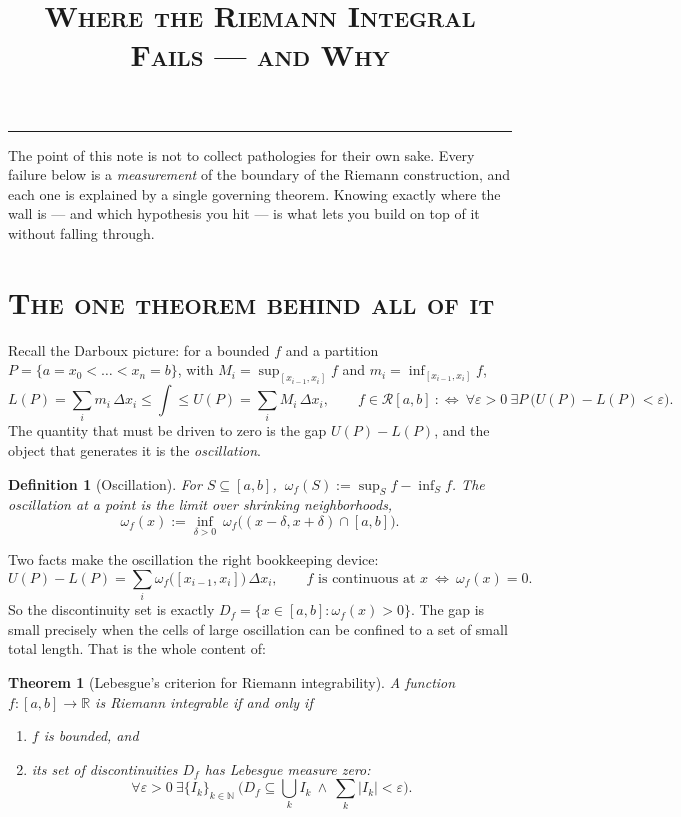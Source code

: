 \documentclass[11pt]{article}
\title{\scshape\color{atlasink} Where the Riemann Integral Fails --- and Why}
\author{}\date{}
\theoremstyle{atlas}
\newtheorem{theorem}{Theorem}
\newtheorem{definition}{Definition}
\newcommand{\R}{\mathbb{R}}
\newcommand{\N}{\mathbb{N}}
\newcommand{\Rint}{\mathcal{R}}
\newcommand{\osc}{\omega_f}
\begin{document}
\maketitle
\vspace{-3.2em}
{\color{atlasink}\rule{\linewidth}{0.8pt}}
\vspace{1em}

The point of this note is not to collect pathologies for their own sake. Every
failure below is a \emph{measurement} of the boundary of the Riemann construction,
and each one is explained by a single governing theorem. Knowing exactly where the
wall is --- and which hypothesis you hit --- is what lets you build on top of it
without falling through.

\section*{\scshape The one theorem behind all of it}

Recall the Darboux picture: for a bounded $f$ and a partition
$P=\{a=x_0<\dots<x_n=b\}$, with $M_i=\sup_{[x_{i-1},x_i]}f$ and
$m_i=\inf_{[x_{i-1},x_i]}f$,
\[
  L(P)=\sum_{i} m_i\,\Delta x_i \le \int \le U(P)=\sum_i M_i\,\Delta x_i,
  \qquad
  f\in\Rint[a,b] \ :\Longleftrightarrow\ \forall\varepsilon>0\ \exists P\ \big(U(P)-L(P)<\varepsilon\big).
\]
The quantity that must be driven to zero is the gap $U(P)-L(P)$, and the object
that generates it is the \emph{oscillation}.

\begin{definition}[Oscillation]
For $S\subseteq[a,b]$, $\ \osc(S):=\sup_{S}f-\inf_{S}f$. The oscillation \emph{at a
point} is the limit over shrinking neighborhoods,
\[
  \osc(x):=\inf_{\delta>0}\ \osc\big((x-\delta,x+\delta)\cap[a,b]\big).
\]
\end{definition}

Two facts make the oscillation the right bookkeeping device:
\[
  U(P)-L(P)=\sum_i \osc\big([x_{i-1},x_i]\big)\,\Delta x_i,
  \qquad
  f \text{ is continuous at } x \ \Longleftrightarrow\ \osc(x)=0.
\]
So the discontinuity set is exactly $D_f=\{x\in[a,b]:\osc(x)>0\}$. The gap is small
precisely when the cells of large oscillation can be confined to a set of small total
length. That is the whole content of:

\begin{theorem}[Lebesgue's criterion for Riemann integrability]
A function $f:[a,b]\to\R$ is Riemann integrable if and only if
\begin{enumerate}
  \item[\textnormal{(i)}] $f$ is \emph{bounded}, and
  \item[\textnormal{(ii)}] its set of discontinuities $D_f$ has \emph{Lebesgue
        measure zero}:
        \[
          \forall\varepsilon>0\ \exists\{I_k\}_{k\in\N}\ \Big(D_f\subseteq\bigcup_k I_k
          \ \wedge\ \sum_k |I_k|<\varepsilon\Big).
        \]
\end{enumerate}
\end{theorem}
\end{document}
